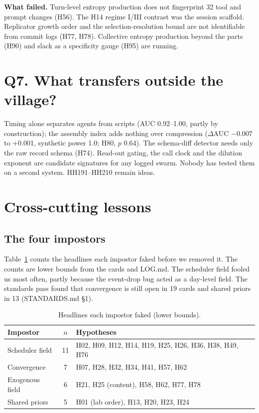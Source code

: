 \documentclass[aps,pre,reprint,10pt,nofootinbib]{revtex4-2}
\begin{document}
\textbf{What failed.} Turn-level entropy production does not fingerprint 32 tool and prompt changes (H56). The H14 regime I/III contrast was the session scaffold. Replicator growth order and the selection-resolution bound are not identifiable from commit logs (H77, H78). Collective entropy production beyond the parts (H90) and slack as a specificity gauge (H95) are running.

\section{Q7. What transfers outside the village?}
Timing alone separates agents from scripts (AUC 0.92--1.00, partly by construction); the assembly index adds nothing over compression ($\Delta$AUC $-0.007$ to +0.001, synthetic power 1.0; H80, $p$ 0.64). The schema-diff detector needs only the raw record schema (H74). Read-out gating, the call clock and the dilution exponent are candidate signatures for any logged swarm. Nobody has tested them on a second system. HH191--HH210 remain ideas.

\section{Cross-cutting lessons}
\subsection{The four impostors}
Table~\ref{tab:imp} counts the headlines each impostor faked before we removed it. The counts are lower bounds from the cards and LOG.md. The scheduler field fooled us most often, partly because the event-drop bug acted as a day-level field. The standards pass found that convergence is still open in 19 cards and shared priors in 13 (STANDARDS.md \S1).

\begin{table}[h]
\caption{\label{tab:imp}Headlines each impostor faked (lower bounds).}
\begin{ruledtabular}
\begin{tabular}{lcp{4.3cm}}
Impostor & $n$ & Hypotheses \\
\hline
Scheduler field & 11 & H02, H09, H12, H14, H19, H25, H26, H36, H38, H49, H76 \\
Convergence & 7 & H07, H28, H32, H34, H41, H57, H62 \\
Exogenous field & 6 & H21, H25 (content), H58, H62, H77, H78 \\
Shared priors & 5 & H01 (lab order), H13, H20, H23, H24 \\
\end{tabular}
\end{ruledtabular}
\end{table}
\end{document}
